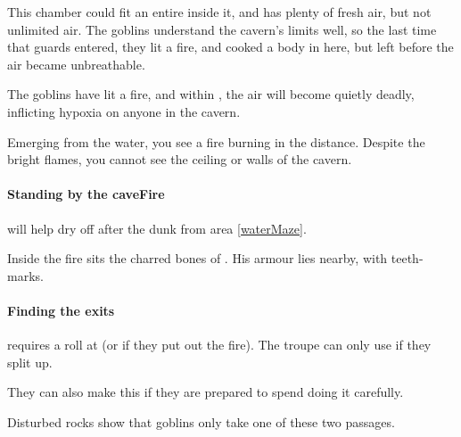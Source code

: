 \begin{multicols}{2}



\begin{exampletext}
  This chamber could fit an entire  inside it, and has plenty of fresh air, but not unlimited air.
  The goblins understand the cavern's limits well, so the last time that \glspl{guard} entered, they lit a fire, and cooked a body in here, but left before the air became unbreathable.
\end{exampletext}

The goblins have lit a fire, and within , the air will become quietly deadly, inflicting \gls{hypoxia} on anyone in the cavern.

\begin{boxtext}
  Emerging from the water, you see a fire burning in the distance.
  Despite the bright flames, you cannot see the ceiling or walls of the cavern.
\end{boxtext}

\paragraph{Standing by the \gls{caveFire}}
will help dry off after the dunk from area \ref{waterMaze}.

Inside the fire sits the charred bones of .
His armour lies nearby, with teeth-marks.

\paragraph{Finding the exits}
requires a  roll at \tn[9] (or \tn[14] if they put out the fire).
The troupe can only use  if they split up.

They can also make this  if they are prepared to spend  doing it carefully.


Disturbed rocks show that goblins only take one of these two passages.


\end{multicols}

